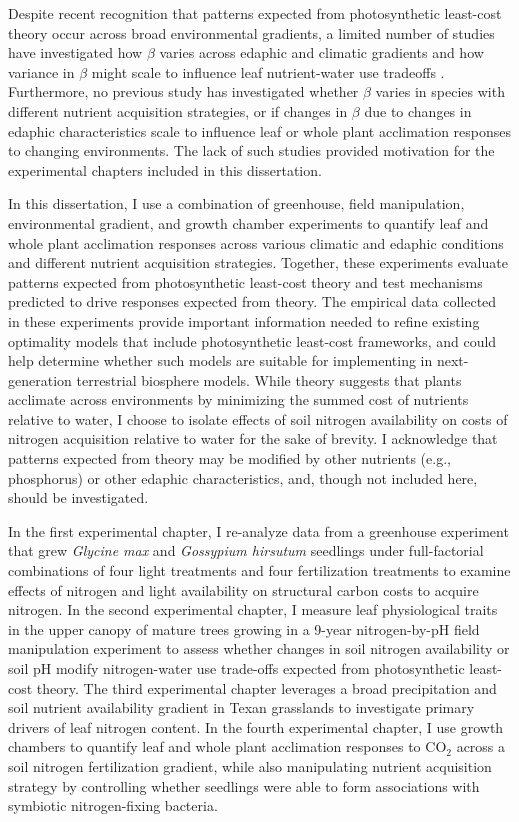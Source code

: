 Despite recent recognition that patterns expected from photosynthetic least-cost theory occur across broad environmental gradients, a limited number of studies have investigated how $\beta$ varies across edaphic and climatic gradients and how variance in $\beta$ might scale to influence leaf nutrient-water use tradeoffs . Furthermore, no previous study has investigated whether $\beta$ varies in species with different nutrient acquisition strategies, or if changes in $\beta$ due to changes in edaphic characteristics scale to influence leaf or whole plant acclimation responses to changing environments. The lack of such studies provided motivation for the experimental chapters included in this dissertation.

In this dissertation, I use a combination of greenhouse, field manipulation, environmental gradient, and growth chamber experiments to quantify leaf and whole plant acclimation responses across various climatic and edaphic conditions and different nutrient acquisition strategies. Together, these experiments evaluate patterns expected from photosynthetic least-cost theory and test mechanisms predicted to drive responses expected from theory. The empirical data collected in these experiments provide important information needed to refine existing optimality models that include photosynthetic least-cost frameworks, and could help determine whether such models are suitable for implementing in next-generation terrestrial biosphere models. While theory suggests that plants acclimate across environments by minimizing the summed cost of nutrients relative to water, I choose to isolate effects of soil nitrogen availability on costs of nitrogen acquisition relative to water for the sake of brevity. I acknowledge that patterns expected from theory may be modified by other nutrients (e.g., phosphorus) or other edaphic characteristics, and, though not included here, should be investigated.

In the first experimental chapter, I re-analyze data from a greenhouse experiment that grew \textit{Glycine max} and \textit{Gossypium hirsutum} seedlings under full-factorial combinations of four light treatments and four fertilization treatments to examine effects of nitrogen and light availability on structural carbon costs to acquire nitrogen. In the second experimental chapter, I measure leaf physiological traits in the upper canopy of mature trees growing in a 9-year nitrogen-by-pH field manipulation experiment to assess whether changes in soil nitrogen availability or soil pH modify nitrogen-water use trade-offs expected from photosynthetic least-cost theory. The third experimental chapter leverages a broad precipitation and soil nutrient availability gradient in Texan grasslands to investigate primary drivers of leaf nitrogen content. In the fourth experimental chapter, I use growth chambers to quantify leaf and whole plant acclimation responses to CO$_2$ across a soil nitrogen fertilization gradient, while also manipulating nutrient acquisition strategy by controlling whether seedlings were able to form associations with symbiotic nitrogen-fixing bacteria.

